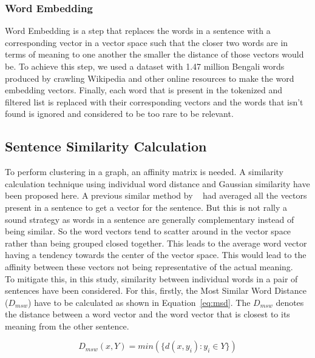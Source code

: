 \subsubsection{Word Embedding}
Word Embedding is a step that replaces the words in a sentence with a corresponding vector in a vector
space such that the closer two words are in terms of meaning to one another the smaller the distance
of those vectors would be.
To achieve this step, we used a dataset with 1.47 million Bengali words produced by \citeauthor{grave-etal-2018-fasttext}
\cite{grave-etal-2018-fasttext} crawling Wikipedia and other online resources to make the word embedding vectors.
Finally, each word that is present in the tokenized and filtered list is replaced with their
corresponding vectors and the words that isn't found is ignored and considered to be too rare to be relevant.

\subsection{Sentence Similarity Calculation}\label{subsec:sentence-similarity-calculation}
To perform clustering in a graph, an affinity matrix is needed.
A similarity calculation technique using individual word distance and
Gaussian similarity have been proposed here.
A previous similar method by \citeauthor{roychowdhury-etal-2022-spectral-base}~\cite{roychowdhury-etal-2022-spectral-base}
had averaged all the vectors present in a sentence to get a vector for the sentence.
But this is not rally a sound strategy as words in a sentence are generally complementary instead of being similar.
So the word vectors tend to scatter around in the vector space rather than being grouped closed together.
This leads to the average word vector having a tendency towards the center of the vector space.
This would lead to the affinity between these vectors not being representative of the actual meaning.\\

To mitigate this, in this study, similarity between individual words in a pair of sentences have been considered.
For this, firstly, the Most Similar Word Distance ($D_{msw}$) have to be calculated as shown in Equation~\ref{eq:msd}.
The $D_{msw}$ denotes the distance between a word vector and the word vector that
is closest to its meaning from the other sentence.

\begin{equation}\label{eq:msd}
    D_{msw}(x,Y) = min(\{d(x,y_i) : y_i \in Y \})
\end{equation}

